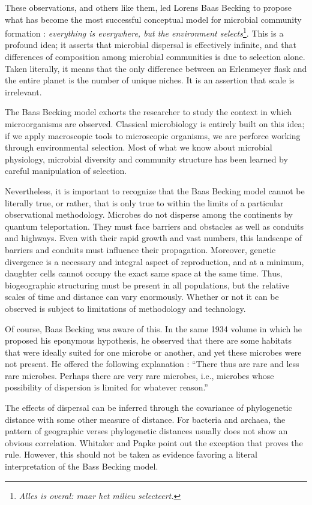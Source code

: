 These observations, and others like them, led Lorens Baas Becking to propose what has become the most successful conceptual model for microbial community formation : {\em everything is everywhere, but the environment selects}\footnote{{\em Alles is overal: maar het milieu selecteert.}}. \cite{oren2011halophilic} This is a profound idea; it asserts that microbial dispersal is effectively infinite, and that differences of composition among microbial communities is due to selection alone. Taken literally, it means that the only difference between an Erlenmeyer flask and the entire planet is the number of unique niches. It is an assertion that scale is irrelevant.

The Baas Becking model exhorts the researcher to study the context in which microorganisms are observed. Classical microbiology is entirely built on this idea; if we apply macroscopic tools to microscopic organisms, we are perforce working through environmental selection. Most of what we know about microbial physiology, microbial diversity and community structure has been learned by careful manipulation of selection.

Nevertheless, it is important to recognize that the Baas Becking model cannot be literally true, or rather, that is only true to within the limits of a particular observational methodology. Microbes do not disperse among the continents by quantum teleportation. They must face barriers and obstacles as well as conduits and highways. Even with their rapid growth and vast numbers, this landscape of barriers and conduits must influence their propagation. Moreover, genetic divergence is a necessary and integral aspect of reproduction, and at a minimum, daughter cells cannot occupy the exact same space at the same time. Thus, biogeographic structuring must be present in all populations, but the relative scales of time and distance can vary enormously. Whether or not it can be observed is subject to limitations of methodology and technology.

Of course, Baas Becking was aware of this. In the same 1934 volume in which he proposed his eponymous hypothesis, he observed that there are some habitats that were ideally suited for one microbe or another, and yet these microbes were not present. He offered the following explanation : ``There thus are rare and less rare microbes. Perhaps there are very rare microbes, i.e., microbes whose possibility of dispersion is limited for whatever reason.'' \cite{oren2011halophilic}

The effects of dispersal can be inferred through the covariance of phylogenetic distance with some other measure of distance. For bacteria and archaea, the pattern of geographic verses phylogenetic distances usually does not show an obvious correlation. Whitaker and Papke point out the exception that proves the rule. However, this should not be taken as evidence favoring a literal interpretation of the Bass Becking model.

